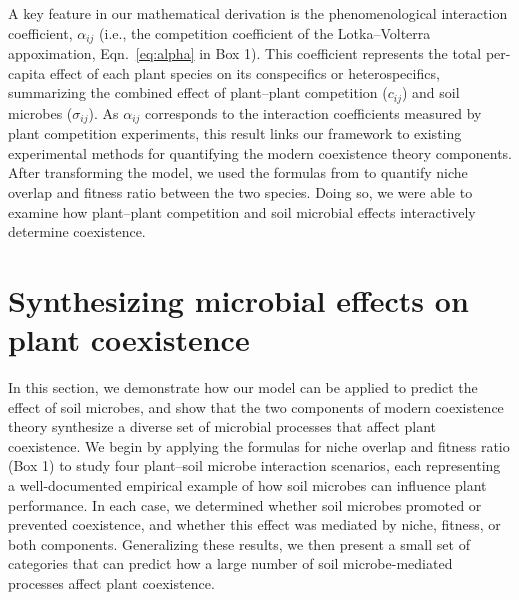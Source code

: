 A key feature in our mathematical derivation is the phenomenological interaction coefficient, $\alpha_{ij}$ (i.e., the competition coefficient of the Lotka--Volterra appoximation, Eqn.~\ref{eq:alpha} in Box 1). This coefficient represents the total per-capita effect of each plant species on its conspecifics or heterospecifics, summarizing the combined effect of plant--plant competition ($c_{ij}$) and soil microbes ($\sigma_{ij}$). As $\alpha_{ij}$ corresponds to the interaction coefficients measured by plant competition experiments, this result links our framework to existing experimental methods for quantifying the modern coexistence theory components.
After transforming the model, we used the formulas from \citet{Chesson2008} to quantify niche overlap and fitness ratio between the two species. Doing so, we were able to examine how plant--plant competition and soil microbial effects interactively determine coexistence.
\par



\section{Synthesizing microbial effects on plant coexistence}
In this section, we demonstrate how our model can be applied to predict the effect of soil microbes, and show that the two components of modern coexistence theory synthesize a diverse set of microbial processes that affect plant coexistence. We begin by applying the formulas for niche overlap and fitness ratio (Box 1) to study four plant--soil microbe interaction scenarios, each representing a well-documented empirical example of how soil microbes can influence plant performance. In each case, we determined whether soil microbes promoted or prevented coexistence, and whether this effect was mediated by niche, fitness, or both components. Generalizing these results, we then present a small set of categories that can predict how a large number of soil microbe-mediated processes affect plant coexistence.
\par



